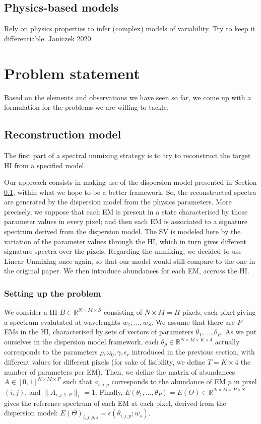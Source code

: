 \documentclass{article}
\begin{document}
\subsection{Physics-based models}\label{sec:dispersion}
Rely on physics properties to infer (complex) models of variability. Try to keep it differentiable. Janiczek 2020.


\section{Problem statement}
Based on the elements and observations we have seen so far, we come up with a formulation for the problems we are willing to tackle.

\subsection{Reconstruction model}
The first part of a spectral unmixing strategy is to try to reconstruct the target HI from a specified model.

Our approach consists in making use of the dispersion model presented in Section \ref{sec:dispersion}, within what we hope to be a better framework. So, the reconstructed spectra are generated by the dispersion model from the physics parameters. More precisely, we suppose that each EM is present in a state characterised by those parameter values in every pixel; and then each EM is associated to a signature spectrum derived from the dispersion model. The SV is modeled here by the variation of the parameter values through the HI, which in turn gives different signature spectra over the pixels. Regarding the unmixing, we decided to use Linear Unmixing once again, so that our model would still compare to the one in the original paper. We then introduce abundances for each EM, accross the HI.

\subsubsection{Setting up the problem}

We consider a HI $B \in \mathbb{R}^{N \times M \times S}$ consisting of $N \times M = \Pi$ pixels, each pixel giving a spectrum evalutated at wavelenghts $w_1,\dots, w_S$. We assume that there are $P$ EMs in the HI, characterised by sets of vectors of parameters $\theta_1,\dots, \theta_P$. As we put ourselves in the dispersion model framework, each $\theta_p \in \mathbb{R}^{N \times M \times K \times 4}$ actually corresponds to the parameters $\rho, \omega_0, \gamma, \epsilon_r$ introduced in the previous section, with different values for different pixels (for sake of lisibility, we define $T = K \times 4$ the number of parameters per EM). Then, we define the matrix of abundances $A \in [0, 1]^{N \times M\times P}$ such that $a_{i, j, p}$ corresponds to the abundance of EM $p$ in pixel $(i, j)$, and $\|A_{i, j, 1:P}\|_1 = 1$. Finally, $E(\theta_1,\dots, \theta_P) = E(\Theta) \in \mathbb{R}^{N \times M \times P \times S}$ gives the reference spectrum of each EM at each pixel, derived from the dispersion model: $E(\Theta)_{i, j, p, s} = \epsilon(\theta_{i, j, p}; w_s)$.
\end{document}
